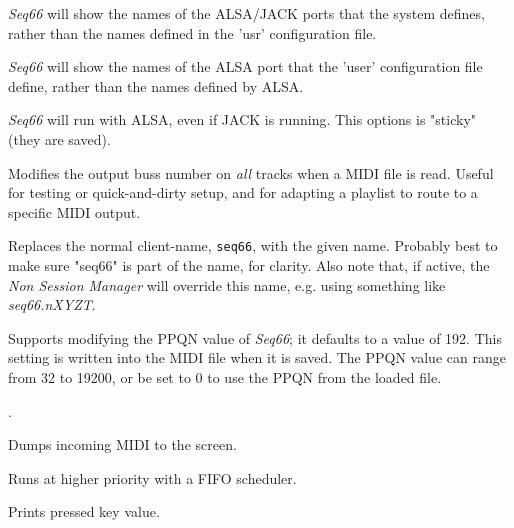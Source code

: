 
      \textsl{Seq66} will show the names of the ALSA/JACK ports that the system
      defines, rather than the names defined in the 'usr' configuration file.

      \textsl{Seq66} will show the names of the ALSA port that the 'user'
      configuration file define, rather than the names defined by ALSA.



      \textsl{Seq66} will run with ALSA, even if JACK is running.
      This options is "sticky" (they are saved).

      Modifies the output buss number on \textsl{all} tracks when a MIDI file is
      read. Useful for testing or quick-and-dirty setup, and for adapting a
      playlist to route to a specific MIDI output.

      Replaces the normal client-name, \texttt{seq66}, with the given name.
      Probably best to make sure "seq66" is part of the name, for clarity.
      Also note that, if active, the \textsl{Non Session Manager} will override
      this name, e.g. using something like \textsl{seq66.nXYZT}.

      Supports modifying the PPQN value of \textsl{Seq66}; it
      defaults to a value of 192.  This setting
      is written into the MIDI file when it is saved.
      The PPQN value can range from 32 to 19200, or
      be set to 0 to use the PPQN from the loaded file.

      .


      Dumps incoming MIDI to the screen.

      Runs at higher priority with a FIFO scheduler.


      Prints pressed key value.

